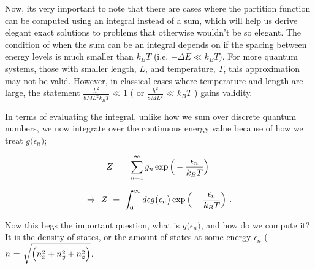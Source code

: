 \documentclass{article}
\begin{document}
Now, its very important to note that there are cases where the partition function can be computed using an integral instead of a sum, which will help us derive elegant exact solutions to problems that otherwise wouldn't be so elegant. The condition of when the sum can be an integral depends on if the spacing between energy levels is much smaller than \begin{math} k_B T \end{math} (i.e. \begin{math} - \Delta E \ll k_B T \end{math}). For more quantum systems, those with smaller length, \begin{math} L \end{math}, and temperature, \begin{math} T \end{math}, this approximation may not be valid. However, in classical cases where temperature and length are large, the statement \begin{math} \frac{h^2}{8 M L^2 k_B T} \ll 1 \end{math} ( or \begin{math} \frac{h^2}{8 M L^2} \ll k_B T \end{math} ) gains validity.

In terms of evaluating the integral, unlike how we sum over discrete quantum numbers, we now integrate over the continuous energy value because of how we treat \begin{math} g \big( \epsilon_{n} \big) \end{math};

\begin{equation} \label{eq:256}
Z \hspace{0.125cm} = \hspace{0.125cm} \sum_{n = 1}^{\infty}  g_{n} \exp{\Big(-\frac{\epsilon_{n}}{k_B T} \Big)} \hspace{0.125cm} 
\end{equation}

\begin{equation} \label{eq:256}
\Rightarrow \hspace{0.125cm} Z \hspace{0.125cm} = \hspace{0.125cm} \int_{0}^{\infty} d \epsilon g \big( \epsilon_n \big) \exp{\Big(-\frac{\epsilon_{n}}{k_B T} \Big)} \hspace{0.125cm} .
\end{equation}

Now this begs the important question, what is \begin{math} g \big( \epsilon_{n} \big) \end{math}, and how do we compute it? It is the density of states, or the amount of states at some energy \begin{math} \epsilon_{n} \end{math} ( \begin{math} n \hspace{0.025cm} = \hspace{0.025cm} \sqrt{ \Big( n_x^2 + n_y^2 + n_z^2 \Big)} \end{math}.
\end{document}
